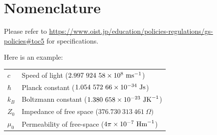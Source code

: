 \chapter*{Nomenclature}

Please refer to \url{https://www.oist.jp/education/policies-regulations/gs-policies#toc5} for specifications.

Here is an example:

\setlength\LTleft{0pt}
\setlength\LTright{0pt}
\begin{xltabular}{\textwidth}{@{}l X@{}}
    $c$     & Speed of light ($2.997\ 924\ 58 \e{8}\ \mbox{ms}^{-1}$)    \\
    $\hbar$ & Planck constant ($1.054\ 572\ 66\e{-34}\ \mbox{Js}$)       \\
    $k_B$   & Boltzmann constant  ($1.380\ 658\e{-23}\ \mbox{JK}^{-1} $) \\
    $Z_0$   & Impedance of free space  ($376.730\ 313\ 461\ \Omega) $    \\
    $\mu_0$ & Permeability of free-space ($4\pi\e{-7}\ \mbox{Hm}^{-1}$)  \\
\end{xltabular}
